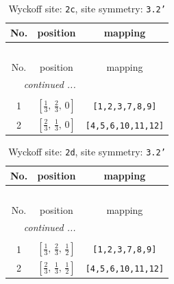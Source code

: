 \documentclass[fleqn,8pt]{jsarticle}
\begin{document}
\begin{longtable}{ccc}
\caption{Wyckoff site: {\tt 2c}, site symmetry: {\tt 3.2'}}
 \\
 \hline \hline
No. & position & mapping \\ \hline \endfirsthead

\multicolumn{2}{l}{\tablename\ \thetable{}} \\
 \hline \hline
No. & position & mapping \\ \hline \endhead

 \hline \hline
\multicolumn{2}{r}{\footnotesize\it continued ...} \\ \endfoot

 \hline \hline
\multicolumn{2}{r}{} \\ \endlastfoot

1 & $\left[ \frac{1}{3},\, \frac{2}{3},\, 0 \right]$ & {\tt [1,2,3,7,8,9]} \\ \hline
2 & $\left[ \frac{2}{3},\, \frac{1}{3},\, 0 \right]$ & {\tt [4,5,6,10,11,12]} \\
\end{longtable}
\renewcommand{\arraystretch}{1.2}
\begin{longtable}{ccc}
\caption{Wyckoff site: {\tt 2d}, site symmetry: {\tt 3.2'}}
 \\
 \hline \hline
No. & position & mapping \\ \hline \endfirsthead

\multicolumn{2}{l}{\tablename\ \thetable{}} \\
 \hline \hline
No. & position & mapping \\ \hline \endhead

 \hline \hline
\multicolumn{2}{r}{\footnotesize\it continued ...} \\ \endfoot

 \hline \hline
\multicolumn{2}{r}{} \\ \endlastfoot

1 & $\left[ \frac{1}{3},\, \frac{2}{3},\, \frac{1}{2} \right]$ & {\tt [1,2,3,7,8,9]} \\ \hline
2 & $\left[ \frac{2}{3},\, \frac{1}{3},\, \frac{1}{2} \right]$ & {\tt [4,5,6,10,11,12]} \\
\end{longtable}
\renewcommand{\arraystretch}{1.2}
\end{document}
